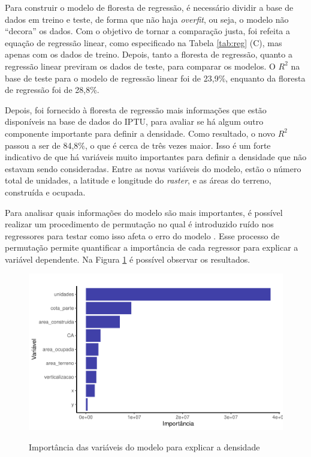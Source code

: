 Para construir o modelo de floresta de regressão, é necessário dividir a base de dados em treino e teste, de forma que não haja \textit{overfit}, ou seja, o modelo não ``decora'' os dados. Com o objetivo de tornar a comparação justa, foi refeita a equação de regressão linear, como especificado na Tabela \ref{tab:reg} (C), mas apenas com os dados de treino. Depois, tanto a floresta de regressão, quanto a regressão linear previram os dados de teste, para comparar os modelos. O $R^2$ na base de teste para o modelo de regressão linear foi de 23,9\%, enquanto da floresta de regressão foi de 28,8\%.


Depois, foi fornecido à floresta de regressão mais informações que estão disponíveis na base de dados do IPTU, para avaliar se há algum outro componente importante para definir a densidade. Como resultado, o novo $R^2$ passou a ser de 84,8\%, o que é cerca de três vezes maior. Isso é um forte indicativo de que há variáveis muito importantes para definir a densidade que não estavam sendo consideradas. Entre as novas variáveis do modelo, estão o número total de unidades, a latitude e longitude do \textit{raster}, e as áreas do terreno, construída e ocupada.

Para analisar quais informações do modelo são mais importantes, é possível realizar um procedimento de permutação no qual é introduzido ruído nos regressores para testar como isso afeta o erro do modelo \cite{breiman2001random, Nembrini2018}. Esse processo de permutação permite quantificar a importância de cada regressor para explicar a variável dependente. Na Figura \ref{fig:importancia} é possível observar os resultados. 

\begin{figure}[h]
    \centering
    \caption{Importância das variáveis do modelo para explicar a densidade}
    \includegraphics[width = .8\linewidth]{imagens/var_importance.pdf}
    \label{fig:importancia}
\end{figure}

